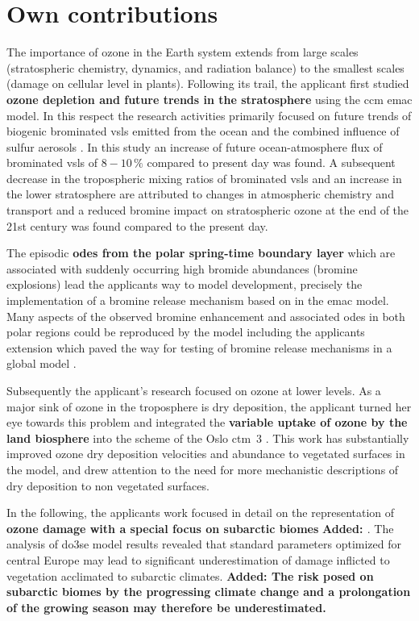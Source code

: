 \section{Own contributions}
\label{sec:contrib}
The importance of ozone in the Earth system extends from large scales (stratospheric chemistry, dynamics, and radiation balance) to the smallest scales (damage on cellular level in plants). Following its trail, the applicant first studied \textbf{ozone depletion and future trends in the stratosphere} using the \gls{ccm} \gls{emac} model. In this respect the research activities primarily focused on future trends of biogenic brominated \gls{vsls} emitted from the ocean and the combined influence of sulfur aerosols \parencite{ACP:Falk2017}. In this study an increase of future ocean-atmosphere flux of brominated \gls{vsls} of $8-10\,\%$ compared to present day was found. A subsequent decrease in the tropospheric mixing ratios of brominated \gls{vsls} and an increase in the lower stratosphere are attributed to changes in atmospheric chemistry and transport and a reduced bromine impact on stratospheric ozone at the end of the 21st century was found compared to the present day.

The episodic \textbf{\glspl{ode} from the polar spring-time boundary layer} which are associated with suddenly occurring high bromide abundances (bromine explosions) lead the applicants way to model development, precisely the implementation of a bromine release mechanism based on \textcite{ACP:Toyota2011} in the \gls{emac} model. Many aspects of the observed bromine enhancement and associated \glspl{ode} in both polar regions could be reproduced by the model including the applicants extension which paved the way for testing of bromine release mechanisms in a global model \parencite{GMD:Falk2018}.

Subsequently the applicant’s research focused on ozone at lower levels. As a major sink of ozone in the troposphere is dry deposition, the applicant turned her eye towards this problem and integrated the \textbf{variable uptake of ozone by the land biosphere} into the scheme of the Oslo \gls{ctm}~3 \parencite{GMD:Falk2019}. This work has substantially improved ozone dry deposition velocities and abundance to vegetated surfaces in the model, and drew attention to the need for more mechanistic descriptions of dry deposition to non vegetated surfaces.

In the following, the applicants work focused in detail on the representation of \textbf{ozone damage with a special focus on subarctic biomes} \textbf{\color{blue}Added: \parencites{ICPTF:Falk2021}{EGU:Falk2021}}. The analysis of \gls{do3se} model results revealed that standard parameters optimized for central Europe may lead to significant underestimation of damage inflicted to vegetation acclimated to subarctic climates. \textbf{\color{blue}Added: The risk posed on subarctic biomes by the progressing climate change and a prolongation of the growing season may therefore be underestimated.}


